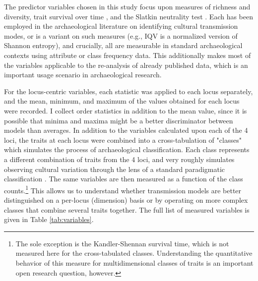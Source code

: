 The predictor variables chosen in this study focus upon measures of richness and
diversity, trait survival over time \citep{Kandler2013}, and the
Slatkin neutrality test \citep{slatkin1996correction, slatkin1994exact}.
Each has been employed in the archaeological literature on identifying
cultural transmission modes, or is a variant on such measures (e.g., IQV
is a normalized version of Shannon entropy), and crucially, all are measurable in standard archaeological contexts using attribute or class frequency data.  This additionally makes most of the variables applicable to the re-analysis of already published data, which is an important usage scenario in archaeological research.   

For the locus-centric variables, each statistic was applied to each
locus separately, and the mean, minimum, and maximum of the values
obtained for each locus were recorded. I collect order statistics
in addition to the mean value, since it is possible that minima and
maxima might be a better discriminator between models than averages. In
addition to the variables calculated upon each of the 4 loci, the traits
at each locus were combined into a cross-tabulation of "classes" which simulates the
process of archaeological classification. Each class represents a
different combination of traits from the 4 loci, and very roughly
simulates observing cultural variation through the lens of a standard
paradigmatic classification \citep{Dunnell1971}. The same variables are
then measured as a function of the class counts.\footnote{The sole exception is the Kandler-Shennan survival time, which is not measured here for the cross-tabulated classes.  Understanding the quantitative behavior of this measure for multidimensional classes of traits is an important open research question, however.} This allows us to
understand whether transmission models are better distinguished on a
per-locus (dimension) basis or by operating on more complex classes that
combine several traits together. The full list of measured variables is
given in Table \ref{tab:variables}.

